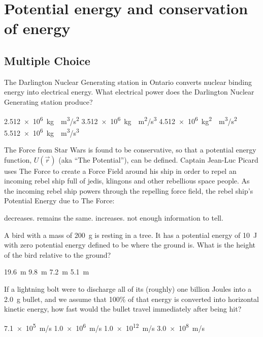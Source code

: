 \section{Potential energy and conservation of energy}

\subsection{Multiple Choice}


\question The Darlington Nuclear Generating station in Ontario converts nuclear binding energy into electrical energy. What electrical power does the Darlington Nuclear Generating station produce?
\begin{choices} 
	\choice \SI{2.512e6}{kg\cdot m^3/s^2}
	\CorrectChoice \SI{3.512e6}{kg\cdot m^2/s^3}
	\choice \SI{4.512e6}{kg^2\cdot m^3/s^2}
	\choice \SI{5.512e6}{kg\cdot m^3/s^3}
\end{choices}

\question The Force from Star Wars is found to be conservative, so that a potential energy function, $U(\vec r)$ (aka ``The Potential''), can be defined. Captain Jean-Luc Picard uses The Force to create a Force Field around his ship in order to repel an incoming rebel ship full of jedis, klingons and other rebellious space people. As the incoming rebel ship powers through the repelling force field, the rebel ship's Potential Energy due to The Force:
\begin{choices} 
	\choice decreases.
	\choice remains the same.
	\CorrectChoice increases.
	\choice not enough information to tell.
\end{choices}

\question A bird with a mass of \SI{200}{g} is resting in a tree. It has a potential energy of \SI{10}{J} with zero potential energy defined to be where the ground is. What is the height of the bird relative to the ground?
\begin{checkboxes}
\choice \SI{19.6}{m}
\choice \SI{9.8}{m}
\choice \SI{7.2}{m}
\CorrectChoice \SI{5.1}{m} \correct
\end{checkboxes}

\question If a lightning bolt were to discharge all of its (roughly) one billion Joules into a \SI{2.0}{g} bullet, and we assume that 100\% of that energy is converted into horizontal kinetic energy, how fast would the bullet travel immediately after being hit?
\begin{checkboxes}
\choice \SI{7.1e5}{m/s}
\CorrectChoice \SI{1.0e6}{m/s} \correct
\choice \SI{1.0e12}{m/s}
\choice \SI{3.0e8}{m/s}
\end{checkboxes}


